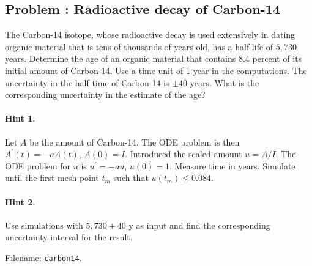 \documentclass[graybox,sectrefs,envcountresetchap,open=right,final]{svmonodo}
\newenvironment{doconceexercise}{}{}
\newcounter{doconceexercisecounter}
\begin{document}
\begin{doconceexercise}

\subsection*{Problem \thedoconceexercisecounter: Radioactive decay of Carbon-14}

\label{decay:app:exer:radio:C14}

The \href{{http://en.wikipedia.org/wiki/Carbon-14}}{Carbon-14} isotope,
whose radioactive decay is used extensively in dating organic material
that is tens of thousands of years old, has a half-life of $5,730$
years.  Determine the age of an organic material that contains 8.4 percent
of its initial amount of Carbon-14.  Use a time unit of 1 year in the
computations.  The uncertainty in the half time of Carbon-14 is $\pm
40$ years.  What is the corresponding uncertainty in the estimate of
the age?


\paragraph{Hint 1.}
Let $A$ be the amount of Carbon-14. The ODE problem is then
$A^{\prime}(t)=-aA(t)$, $A(0)=I$. Introduced the scaled amount
$u=A/I$. The ODE problem for $u$ is $u^{\prime}=-au$, $u(0)=1$.
Measure time in years.
Simulate until the first mesh point $t_m$ such that $u(t_m)\leq 0.084$.



\paragraph{Hint 2.}
Use simulations with $5,730\pm 40$ y as input
and find the corresponding uncertainty interval for the result.



\noindent Filename: \texttt{carbon14}.

\end{doconceexercise}
\end{document}
